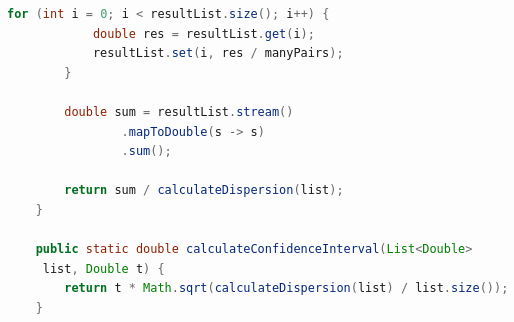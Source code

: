 \documentclass[a4paper,12pt]{article}
\begin{document}
\begin{lstlisting}[language=Java, title=Рассчет и отображение параметров распределения]
        for (int i = 0; i < resultList.size(); i++) {
            double res = resultList.get(i);
            resultList.set(i, res / manyPairs);
        }

        double sum = resultList.stream()
                .mapToDouble(s -> s)
                .sum();

        return sum / calculateDispersion(list);
    }

    public static double calculateConfidenceInterval(List<Double>
     list, Double t) {
        return t * Math.sqrt(calculateDispersion(list) / list.size());
    }

\end{lstlisting}
\end{document}
